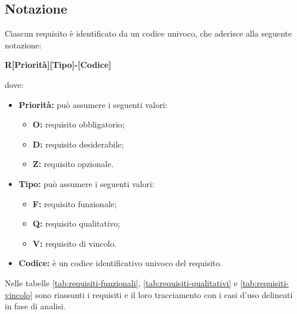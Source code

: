 \subsection{Notazione}
Ciascun requisito è identificato da un codice univoco, che aderisce alla
seguente notazione:
\begin{center}
    \textbf{R[Priorità][Tipo]-[Codice]}
\end{center}
dove:
\begin{itemize}
    \item \textbf{Priorità:} può assumere i seguenti valori:
          \begin{itemize}
              \item \textbf{O:} requisito obbligatorio;
              \item \textbf{D:} requisito desiderabile;
              \item \textbf{Z:} requisito opzionale.
          \end{itemize}
    \item \textbf{Tipo:} può assumere i seguenti valori:
          \begin{itemize}
              \item \textbf{F:} requisito funzionale;
              \item \textbf{Q:} requisito qualitativo;
              \item \textbf{V:} requisito di vincolo.
          \end{itemize}
    \item \textbf{Codice:} è un codice identificativo univoco del requisito.
\end{itemize}

Nelle tabelle \ref{tab:requisiti-funzionali}, \ref{tab:requisiti-qualitativi} e
\ref{tab:requisiti-vincolo} sono riassunti i requisiti e il loro tracciamento
con i casi d'uso delineati in fase di analisi.


